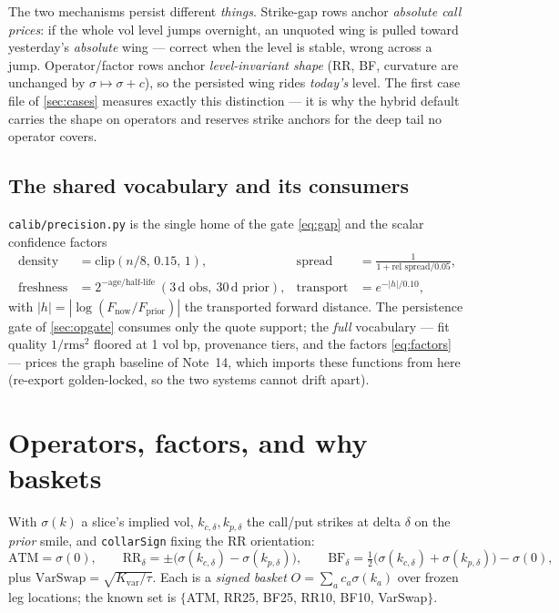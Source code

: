 \documentclass[11pt]{article}
\begin{document}
\begin{caution}
The two mechanisms persist different \emph{things}. Strike-gap rows anchor
\emph{absolute call prices}: if the whole vol level jumps overnight, an
unquoted wing is pulled toward yesterday's \emph{absolute} wing --- correct
when the level is stable, wrong across a jump. Operator/factor rows anchor
\emph{level-invariant shape} (RR, BF, curvature are unchanged by
$\sigma\mapsto\sigma+c$), so the persisted wing rides \emph{today's} level.
The first case file of \cref{sec:cases} measures exactly this distinction ---
it is why the hybrid default carries the shape on operators and reserves
strike anchors for the deep tail no operator covers.
\end{caution}

\subsection{The shared vocabulary and its consumers}
\label{sec:vocab}

\texttt{calib/precision.py} is the single home of the gate
\eqref{eq:gap} and the scalar confidence factors
\begin{equation}
\begin{aligned}
\text{density}&=\mathrm{clip}(n/8,\,0.15,\,1), &
\text{spread}&=\frac{1}{1+\text{rel spread}/0.05},\\
\text{freshness}&=2^{-\text{age}/\text{half-life}}\ (3\,\text{d obs},\ 30\,\text{d prior}), &
\text{transport}&=e^{-|h|/0.10},
\end{aligned}
\label{eq:factors}
\end{equation}
with $|h|=|\log(F_{\text{now}}/F_{\text{prior}})|$ the transported forward
distance. The persistence gate of \cref{sec:opgate} consumes only the quote
support; the \emph{full} vocabulary --- fit quality $1/\text{rms}^2$ floored
at 1 vol bp, provenance tiers, and the factors \eqref{eq:factors} --- prices
the graph baseline of Note~14, which imports these functions from here
(re-export golden-locked, so the two systems cannot drift apart).

\section{Operators, factors, and why baskets}
\label{sec:operators}

\begin{definition}
\label{def:operators}
With $\sigma(k)$ a slice's implied vol, $k_{c,\delta},k_{p,\delta}$ the
call/put strikes at delta $\delta$ on the \emph{prior} smile, and
\texttt{collarSign} fixing the RR orientation:
\[
\text{ATM}=\sigma(0),\qquad
\text{RR}_\delta=\pm\big(\sigma(k_{c,\delta})-\sigma(k_{p,\delta})\big),\qquad
\text{BF}_\delta=\tfrac12\big(\sigma(k_{c,\delta})+\sigma(k_{p,\delta})\big)-\sigma(0),
\]
plus $\text{VarSwap}=\sqrt{K_{\text{var}}/\tau}$. Each is a \emph{signed
basket} $O=\sum_ac_a\sigma(k_a)$ over frozen leg locations; the known set is
$\{$ATM, RR25, BF25, RR10, BF10, VarSwap$\}$.
\end{definition}
\end{document}
